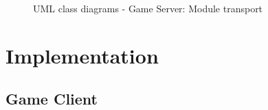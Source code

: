 \documentclass[11pt,ngerman]{article}
\begin{document}
            \begin{figure}[H]
                \centering
                \caption{UML class diagrams - Game Server: Module transport}
                \label{fig:UMLclassdiagram_Moduletransport}
            \end{figure}
            \newpage

    \section{Implementation}

    \subsection{Game Client}
\end{document}
